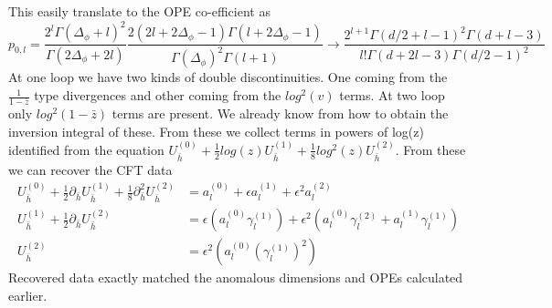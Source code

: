 \documentclass[12pt,a4paper,oneside]{book}
\theoremstyle{definition}
\begin{document}
            This easily translate to the OPE co-efficient as 
            \begin{equation}
                p_{0,l} = \frac{2^l\Gamma(\Delta_{\phi}+l)^2}{\Gamma(2\Delta_{\phi}+2l)}\frac{2(2l+2\Delta_{\phi}-1)\Gamma(l+2\Delta_{\phi}-1)}{\Gamma(\Delta_{\phi})^2\Gamma(l+1)}\to \frac{2^{l+1}\Gamma(d/2+l-1)^2\Gamma(d+l-3)}{l!\Gamma(d+2l-3)\Gamma(d/2-1)^2}
            \end{equation}
            At one loop we have two kinds of double discontinuities. One coming from the $\frac{1}{1-\bar{z}}$ type divergences and other coming from the $log^2(v)$ terms. At two loop only $log^2(1-\bar{z})$ terms are present. We already know from how to obtain the inversion integral of these. From these we collect terms in powers of log(z) identified from the equation $U_{\bar{h}}^{(0)} + \frac{1}{2}log(z)U_{\bar{h}}^{(1)} + \frac{1}{8}log^2(z)U_{\bar{h}}^{(2)}$. From these we can recover the CFT data
            \begin{align}
                U_{\bar{h}}^{(0)} +\frac{1}{2}\partial_{\bar{h}}U_{\bar{h}}^{(1)} + \frac{1}{8}\partial_{\bar{h}}^2U_{\bar{h}}^{(2)}  &= a_l^{(0)} + \epsilon a_l^{(1)} + \epsilon^2a_l^{(2)}\nonumber\\
                U_{\bar{h}}^{(1)} +\frac{1}{2}\partial_{\bar{h}}U_{\bar{h}}^{(2)} &= \epsilon \left(a_l^{(0)}\gamma_l^{(1)}\right) + \epsilon^2\left(a_l^{(0)}\gamma_l^{(2)} + a_l^{(1)}\gamma_l^{(1)} \right)\\
                U_{\bar{h}}^{(2)} &= \epsilon^2\left(a_l^{(0)}(\gamma_l^{(1)})^2\right)\nonumber
            \end{align}
            Recovered data exactly matched the anomalous dimensions and OPEs calculated earlier. 
\end{document}
